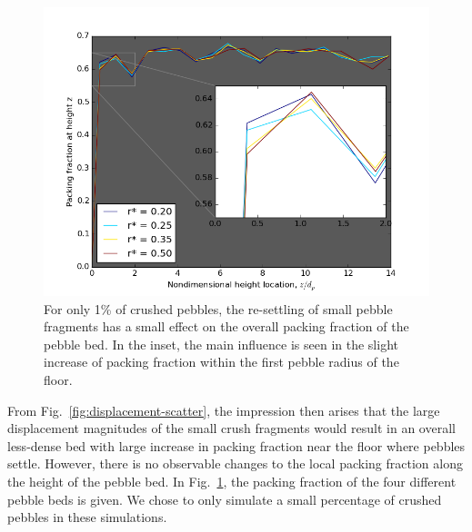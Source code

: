 \begin{figure}[!t]
\centering
    \includegraphics[width=\singleimagewidth]{chapters/figures/crush-fragments/packing-fraction-height.png}
    \caption{For only 1\% of crushed pebbles, the re-settling of small pebble fragments has a small effect on the overall packing fraction of the pebble bed. In the inset, the main influence is seen in the slight increase of packing fraction within the first pebble radius of the floor.}
    \label{fig:fragment-packing-fraction}
\end{figure}

From Fig.~\ref{fig:displacement-scatter}, the impression then arises that the large displacement magnitudes of the small crush fragments would result in an overall less-dense bed with large increase in packing fraction near the floor where pebbles settle. However, there is no observable changes to the local packing fraction along the height of the pebble bed. In Fig.~\ref{fig:fragment-packing-fraction}, the packing fraction of the four different pebble beds is given. We chose to only simulate a small percentage of crushed pebbles in these simulations. 